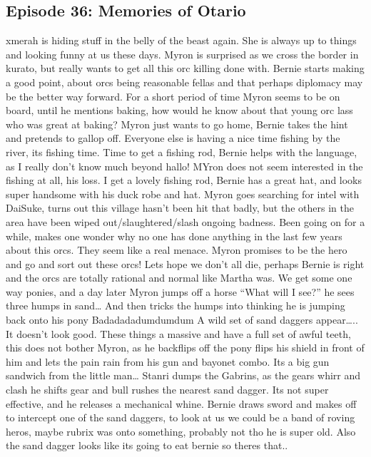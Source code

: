 \subsection{Episode 36: Memories of Otario}
xmerah is hiding stuff in the belly of the beast again. She is always up to things and looking funny at us these days.\medskip
Myron is surprised as we cross the border in kurato, but really wants to get all this orc killing done with. Bernie starts making a good point, about orcs being reasonable fellas and that perhaps diplomacy may be the better way forward. For a short period of time Myron seems to be on board, until he mentions baking, how would he know about that young orc lass who was great at baking? Myron just wants to go home, Bernie takes the hint and pretends to gallop off.\medskip
Everyone else is having a nice time fishing by the river, its fishing time. Time to get a fishing rod, Bernie helps with the language, as I really don’t know much beyond hallo!\medskip
MYron does not seem interested in the fishing at all, his loss. I get a lovely fishing rod, Bernie has a great hat, and looks super handsome with his duck robe and hat.\medskip
Myron goes searching for intel with DaiSuke, turns out this village hasn’t been hit that badly, but the others in the area have been wiped out/slaughtered/slash ongoing badness. Been going on for a while, makes one wonder why no one has done anything in the last few years about this orcs. They seem like a real menace. Myron promises to be the hero and go and sort out these orcs! Lets hope we don’t all die, perhaps Bernie is right and the orcs are totally rational and normal like Martha was.\medskip
We get some one way ponies, and a day later Myron jumps off a horse\medskip
“What will I see?” he sees three humps in sand…\medskip
And then tricks the humps into thinking he is jumping back onto his pony\medskip
Badadadadumdumdum\medskip
A wild set of sand daggers appear….. It doesn’t look good.\medskip
These things a massive and have a full set of awful teeth, this does not bother Myron, as he backflips off the pony flips his shield in front of him and lets the pain rain from his gun and bayonet combo. Its a big gun sandwich from the little man…\medskip
Stanri dumps the Gabrins, as the gears whirr and clash he shifts gear and bull rushes the nearest sand dagger. Its not super effective, and he releases a mechanical whine.\medskip
Bernie draws sword and makes off to intercept one of the sand daggers, to look at us we could be a band of roving heros, maybe rubrix was onto something, probably not tho he is super old. Also the sand dagger looks like its going to eat bernie so theres that..\medskip
